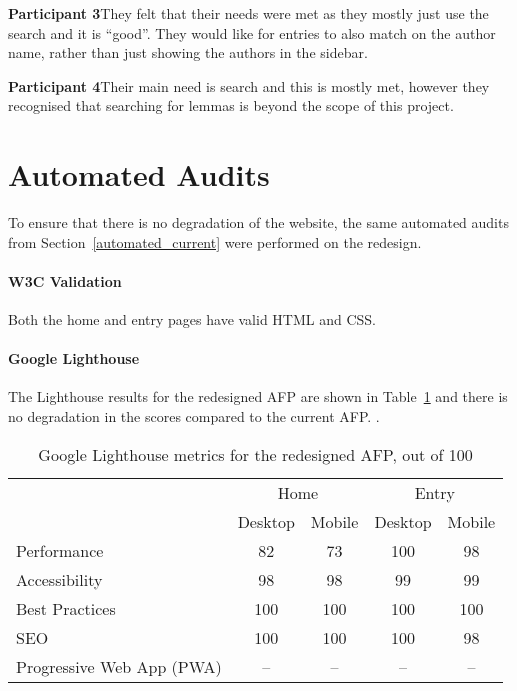 \documentclass[bsc,frontabs,oneside,singlespacing,parskip,deptreport,logo]{infthesis}
\begin{document}
\textbf{Participant 3}\quad They felt that their needs were met as they mostly just use the search and it is ``good''. They would like for entries to also match on the author name, rather than just showing the authors in the sidebar.

\textbf{Participant 4}\quad Their main need is search and this is mostly met, however they recognised that searching for lemmas  is beyond the scope of this project.

\section{Automated Audits}

To ensure that there is no degradation of the website, the same automated audits from Section~\ref{automated_current} were performed on the redesign.

\paragraph*{W3C Validation}

Both the home and entry pages have valid HTML and CSS\@.

\paragraph*{Google Lighthouse} \label{sec:lighthouse-redesign}

The Lighthouse results for the redesigned AFP are shown in Table~\ref{tab:lighthouse-redesign} and there is no degradation in the scores compared to the current AFP\@. . 

\begin{table}[h]
\centering
{}
\begin{tabularx}{0.5\textwidth}{lcccc}
                          & \multicolumn{2}{c}{Home} & \multicolumn{2}{c}{Entry} \\
                          & Desktop     & Mobile     & Desktop      & Mobile     \\
Performance               & 82          & 73         & 100          & 98         \\
Accessibility             & 98          & 98         & 99           & 99         \\
Best Practices            & 100         & 100        & 100          & 100        \\
SEO                       & 100         & 100        & 100           & 98         \\
Progressive Web App (PWA) & --          & --         & --           & --        
\end{tabularx}
\caption{Google Lighthouse metrics for the redesigned AFP, out of 100}
\label{tab:lighthouse-redesign}
\end{table}
\end{document}
